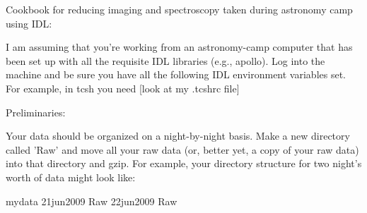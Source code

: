 Cookbook for reducing imaging and spectroscopy taken during astronomy
camp using IDL:

I am assuming that you're working from an astronomy-camp computer that
has been set up with all the requisite IDL libraries (e.g., apollo).
Log into the machine and be sure you have all the following
IDL environment variables set.  For example, in tcsh you need [look at
  my .tcshrc file]

Preliminaries:

Your data should be organized on a night-by-night basis.  Make a new
directory called 'Raw' and move all your raw data (or, better yet, a
copy of your raw data) into that directory and gzip.  For example,
your directory structure for two night's worth of data might look
like:

mydata
  21jun2009
    Raw
  22jun2009
    Raw

